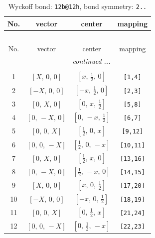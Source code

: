 \documentclass[fleqn,8pt]{jsarticle}
\begin{document}
\renewcommand{\arraystretch}{1.2}
\begin{longtable}{cccc}
\caption{Wyckoff bond: {\tt 12b@12h}, bond symmetry: {\tt 2..}}
 \\
 \hline \hline
No. & vector & center & mapping \\ \hline \endfirsthead

\multicolumn{3}{l}{\tablename\ \thetable{}} \\
 \hline \hline
No. & vector & center & mapping \\ \hline \endhead

 \hline \hline
\multicolumn{3}{r}{\footnotesize\it continued ...} \\ \endfoot

 \hline \hline
\multicolumn{3}{r}{} \\ \endlastfoot

1 & $\left[ X,\, 0,\, 0 \right]$ & $\left[ x,\, \frac{1}{2},\, 0 \right]$ & {\tt [1,4]} \\ \hline
2 & $\left[ - X,\, 0,\, 0 \right]$ & $\left[ - x,\, \frac{1}{2},\, 0 \right]$ & {\tt [2,3]} \\ \hline
3 & $\left[ 0,\, X,\, 0 \right]$ & $\left[ 0,\, x,\, \frac{1}{2} \right]$ & {\tt [5,8]} \\ \hline
4 & $\left[ 0,\, - X,\, 0 \right]$ & $\left[ 0,\, - x,\, \frac{1}{2} \right]$ & {\tt [6,7]} \\ \hline
5 & $\left[ 0,\, 0,\, X \right]$ & $\left[ \frac{1}{2},\, 0,\, x \right]$ & {\tt [9,12]} \\ \hline
6 & $\left[ 0,\, 0,\, - X \right]$ & $\left[ \frac{1}{2},\, 0,\, - x \right]$ & {\tt [10,11]} \\ \hline
7 & $\left[ 0,\, X,\, 0 \right]$ & $\left[ \frac{1}{2},\, x,\, 0 \right]$ & {\tt [13,16]} \\ \hline
8 & $\left[ 0,\, - X,\, 0 \right]$ & $\left[ \frac{1}{2},\, - x,\, 0 \right]$ & {\tt [14,15]} \\ \hline
9 & $\left[ X,\, 0,\, 0 \right]$ & $\left[ x,\, 0,\, \frac{1}{2} \right]$ & {\tt [17,20]} \\ \hline
10 & $\left[ - X,\, 0,\, 0 \right]$ & $\left[ - x,\, 0,\, \frac{1}{2} \right]$ & {\tt [18,19]} \\ \hline
11 & $\left[ 0,\, 0,\, X \right]$ & $\left[ 0,\, \frac{1}{2},\, x \right]$ & {\tt [21,24]} \\ \hline
12 & $\left[ 0,\, 0,\, - X \right]$ & $\left[ 0,\, \frac{1}{2},\, - x \right]$ & {\tt [22,23]} \\
\end{longtable}
\end{document}

